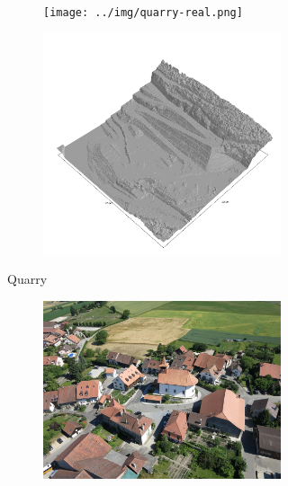 \documentclass[../document.tex]{subfiles}
\begin{document}
\begin{figure}[H]
    \centering
    \begin{subfigure}[b]{1\textwidth}
    \begin{subfigure}[b]{0.45\textwidth}
        \texttt{[image: ../img/quarry-real.png]}
    \end{subfigure}
    \begin{subfigure}[b]{0.45\textwidth}
        \includegraphics[width=\textwidth]{../img/hm3d_borders/querry-big-10.png}
    \end{subfigure}
    \caption{Quarry}
\end{subfigure}
\begin{subfigure}[b]{1\textwidth}
    \begin{subfigure}[b]{0.45\textwidth}
        \includegraphics[width=\textwidth]{../img/sullens-real.jpg}

\end{subfigure}
\end{subfigure}
\end{figure}
\end{document}
